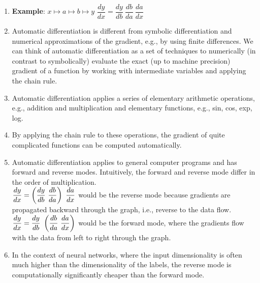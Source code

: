 \begin{enumerate}
    \item[] \textbf{Example}: $x \mapsto a \mapsto b \mapsto y$
    \hspace{1cm}
    $
        \dfrac{dy}{dx} = \dfrac{dy}{db}\ \dfrac{db}{da}\ \dfrac{da}{dx}
    $
    \hfill \cite{mfml/book/mml/Deisenroth-Faisal-Ong}

    \item
    \begin{definition}
        Automatic differentiation is different from symbolic differentiation and numerical approximations of the gradient, e.g., by using finite differences.
        We can think of automatic differentiation as a set of techniques to numerically (in contrast to symbolically) evaluate the exact (up to machine precision) gradient of a function by working with intermediate variables and applying the chain rule.
        \hfill \cite{mfml/book/mml/Deisenroth-Faisal-Ong}
    \end{definition}


    \item Automatic differentiation applies a series of elementary arithmetic operations, e.g., addition and multiplication and elementary functions, e.g., sin, cos, exp, log.
    \hfill \cite{mfml/book/mml/Deisenroth-Faisal-Ong}

    \item By applying the chain rule to these operations, the gradient of quite complicated functions can be computed automatically.
    \hfill \cite{mfml/book/mml/Deisenroth-Faisal-Ong}

    \item Automatic differentiation applies to general computer programs and has forward and reverse modes.
    Intuitively, the forward and reverse mode differ in the order of multiplication.
    \\
    $\dfrac{dy}{dx} = \dParenBrac{\dfrac{dy}{db}\ \dfrac{db}{da}}\ \dfrac{da}{dx}$ would be the reverse mode because gradients are propagated backward through the graph, i.e., reverse to the data flow.
    $\dfrac{dy}{dx} = \dfrac{dy}{db}\ \left(\dfrac{db}{da}\ \dfrac{da}{dx}\right)$ would be the forward mode, where the gradients flow with the data from left to right through the graph.

    \item In the context of neural networks, where the input dimensionality is often much higher than the dimensionality of the labels, the reverse mode is computationally significantly cheaper than the forward mode.
    \hfill \cite{mfml/book/mml/Deisenroth-Faisal-Ong}


\end{enumerate}

